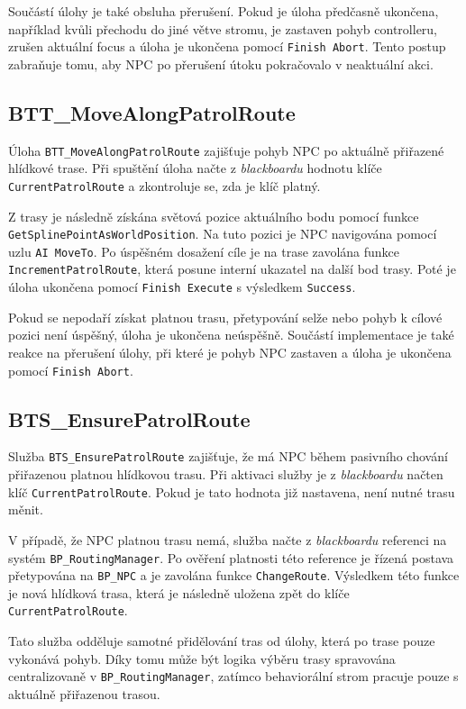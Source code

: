 Součástí úlohy je také obsluha přerušení. 
Pokud je úloha předčasně ukončena, například kvůli přechodu do jiné větve stromu, je zastaven pohyb controlleru, zrušen aktuální focus 
a úloha je ukončena pomocí \texttt{Finish Abort}. 
Tento postup zabraňuje tomu, aby NPC po přerušení útoku pokračovalo v neaktuální akci.

\subsection{BTT\_MoveAlongPatrolRoute}

Úloha \texttt{BTT\_MoveAlongPatrolRoute} zajišťuje pohyb NPC po aktuálně přiřazené hlídkové trase. 
Při spuštění úloha načte z \textit{blackboardu} hodnotu klíče \texttt{CurrentPatrolRoute} a zkontroluje se, zda je klíč platný.

Z trasy je následně získána světová pozice aktuálního bodu pomocí funkce \texttt{GetSplinePointAsWorldPosition}. 
Na tuto pozici je NPC navigována pomocí uzlu \texttt{AI MoveTo}. 
Po úspěšném dosažení cíle je na trase zavolána funkce \texttt{IncrementPatrolRoute}, která posune interní ukazatel na další bod trasy. 
Poté je úloha ukončena pomocí \texttt{Finish Execute} s výsledkem \texttt{Success}.

Pokud se nepodaří získat platnou trasu, přetypování selže nebo pohyb k cílové pozici není úspěšný, úloha je ukončena neúspěšně. 
Součástí implementace je také reakce na přerušení úlohy, při které je pohyb NPC zastaven a úloha je ukončena pomocí \texttt{Finish Abort}.

\subsection{BTS\_EnsurePatrolRoute}

Služba \texttt{BTS\_EnsurePatrolRoute} zajišťuje, že má NPC během pasivního chování přiřazenou platnou hlídkovou trasu. 
Při aktivaci služby je z \textit{blackboardu} načten klíč \texttt{CurrentPatrolRoute}. 
Pokud je tato hodnota již nastavena, není nutné trasu měnit.

V případě, že NPC platnou trasu nemá, služba načte z \textit{blackboardu} referenci na systém \texttt{BP\_RoutingManager}. 
Po ověření platnosti této reference je řízená postava přetypována na \texttt{BP\_NPC} a je zavolána funkce \texttt{ChangeRoute}. 
Výsledkem této funkce je nová hlídková trasa, která je následně uložena zpět do klíče \texttt{CurrentPatrolRoute}.

Tato služba odděluje samotné přidělování tras od úlohy, která po trase pouze vykonává pohyb. 
Díky tomu může být logika výběru trasy spravována centralizovaně v \texttt{BP\_RoutingManager}, zatímco behaviorální strom pracuje pouze 
s aktuálně přiřazenou trasou.

